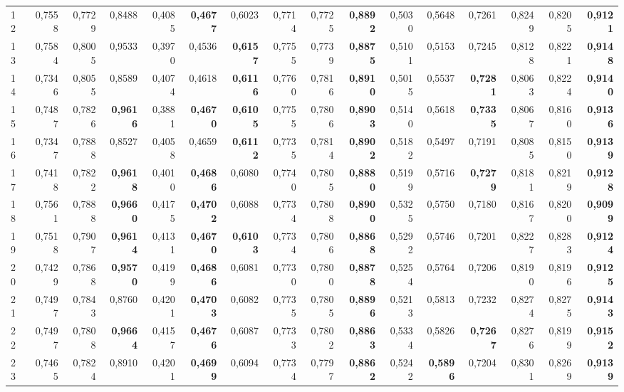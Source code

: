 \begin{table}[htp!]
\begin{adjustwidth}{-2cm}{}
\begin{tabular}{ l | *{15}{| r}}
12	&	0,7558	&	0,7729	&	0,8488	&	0,4085	&	\textbf{0,4677}	&	0,6023	&	0,7714	&	0,7725	&	\textbf{0,8892}	&	0,5030	&	0,5648	&	0,7261	&	0,8249	&	0,8205	&	\textbf{0,9121}	\\
13	&	0,7584	&	0,8005	&	0,9533	&	0,3970	&	0,4536	&	\textbf{0,6157}	&	0,7755	&	0,7739	&	\textbf{0,8875}	&	0,5101	&	0,5153	&	0,7245	&	0,8128	&	0,8221	&	\textbf{0,9148}	\\
14	&	0,7346	&	0,8055	&	0,8589	&	0,4074	&	0,4618	&	\textbf{0,6116}	&	0,7760	&	0,7816	&	\textbf{0,8910}	&	0,5015	&	0,5537	&	\textbf{0,7281}	&	0,8063	&	0,8224	&	\textbf{0,9140}	\\
15	&	0,7487	&	0,7826	&	\textbf{0,9616}	&	0,3881	&	\textbf{0,4670}	&	\textbf{0,6105}	&	0,7755	&	0,7806	&	\textbf{0,8903}	&	0,5140	&	0,5618	&	\textbf{0,7335}	&	0,8067	&	0,8160	&	\textbf{0,9136}	\\
16	&	0,7347	&	0,7888	&	0,8527	&	0,4058	&	0,4659	&	\textbf{0,6112}	&	0,7735	&	0,7814	&	\textbf{0,8902}	&	0,5182	&	0,5497	&	0,7191	&	0,8085	&	0,8150	&	\textbf{0,9139}	\\
17	&	0,7418	&	0,7822	&	\textbf{0,9618}	&	0,4010	&	\textbf{0,4686}	&	0,6080	&	0,7740	&	0,7805	&	\textbf{0,8880}	&	0,5199	&	0,5716	&	\textbf{0,7279}	&	0,8181	&	0,8219	&	\textbf{0,9128}	\\
18	&	0,7561	&	0,7888	&	\textbf{0,9660}	&	0,4175	&	\textbf{0,4702}	&	0,6088	&	0,7734	&	0,7808	&	\textbf{0,8900}	&	0,5325	&	0,5750	&	0,7180	&	0,8167	&	0,8200	&	\textbf{0,9099}	\\
19	&	0,7518	&	0,7907	&	\textbf{0,9614}	&	0,4131	&	\textbf{0,4670}	&	\textbf{0,6103}	&	0,7734	&	0,7806	&	\textbf{0,8868}	&	0,5292	&	0,5746	&	0,7201	&	0,8227	&	0,8283	&	\textbf{0,9124}	\\
20	&	0,7429	&	0,7868	&	\textbf{0,9570}	&	0,4199	&	\textbf{0,4686}	&	0,6081	&	0,7730	&	0,7800	&	\textbf{0,8878}	&	0,5254	&	0,5764	&	0,7206	&	0,8190	&	0,8196	&	\textbf{0,9125}	\\
21	&	0,7497	&	0,7843	&	0,8760	&	0,4201	&	\textbf{0,4703}	&	0,6082	&	0,7735	&	0,7805	&	\textbf{0,8896}	&	0,5213	&	0,5813	&	0,7232	&	0,8274	&	0,8275	&	\textbf{0,9143}	\\
22	&	0,7497	&	0,7808	&	\textbf{0,9664}	&	0,4157	&	\textbf{0,4676}	&	0,6087	&	0,7733	&	0,7802	&	\textbf{0,8863}	&	0,5334	&	0,5826	&	\textbf{0,7267}	&	0,8276	&	0,8199	&	\textbf{0,9152}	\\
23	&	0,7465	&	0,7824	&	0,8910	&	0,4201	&	\textbf{0,4699}	&	0,6094	&	0,7734	&	0,7797	&	\textbf{0,8862}	&	0,5242	&	\textbf{0,5896}	&	0,7204	&	0,8301	&	0,8269	&	\textbf{0,9139}	\\

\end{tabular}
\end{adjustwidth}
\end{table}
